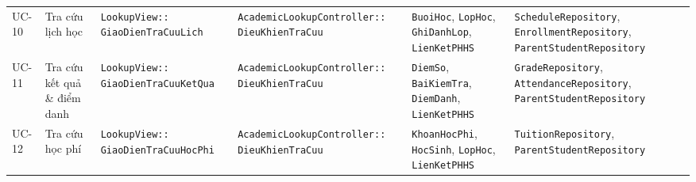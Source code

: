 \begin{landscape}
\begin{table}[p]
\begin{tabularx}{\linewidth}{@{}l >{\raggedright\arraybackslash}p{3.2cm} >{\raggedright\arraybackslash}p{4.2cm} >{\raggedright\arraybackslash}p{4.6cm} >{\raggedright\arraybackslash}p{4.8cm} >{\raggedright\arraybackslash}X@{}}
    UC-10 & Tra cứu lịch học & \texttt{LookupView::} \newline \texttt{GiaoDienTraCuuLich} & \texttt{AcademicLookupController::} \newline \texttt{DieuKhienTraCuu} & \texttt{BuoiHoc}, \texttt{LopHoc}, \newline \texttt{GhiDanhLop}, \texttt{LienKetPHHS} & \texttt{ScheduleRepository}, \newline \texttt{EnrollmentRepository}, \newline \texttt{ParentStudentRepository} \\
    UC-11 & Tra cứu kết quả \& điểm danh & \texttt{LookupView::} \newline \texttt{GiaoDienTraCuuKetQua} & \texttt{AcademicLookupController::} \newline \texttt{DieuKhienTraCuu} & \texttt{DiemSo}, \texttt{BaiKiemTra}, \newline \texttt{DiemDanh}, \texttt{LienKetPHHS} & \texttt{GradeRepository}, \newline \texttt{AttendanceRepository}, \newline \texttt{ParentStudentRepository} \\
    UC-12 & Tra cứu học phí & \texttt{LookupView::} \newline \texttt{GiaoDienTraCuuHocPhi} & \texttt{AcademicLookupController::} \newline \texttt{DieuKhienTraCuu} & \texttt{KhoanHocPhi}, \texttt{HocSinh}, \newline \texttt{LopHoc}, \texttt{LienKetPHHS} & \texttt{TuitionRepository}, \newline \texttt{ParentStudentRepository} \\
    \bottomrule
  \end{tabularx}
\end{table}
\clearpage
\end{landscape}
%

